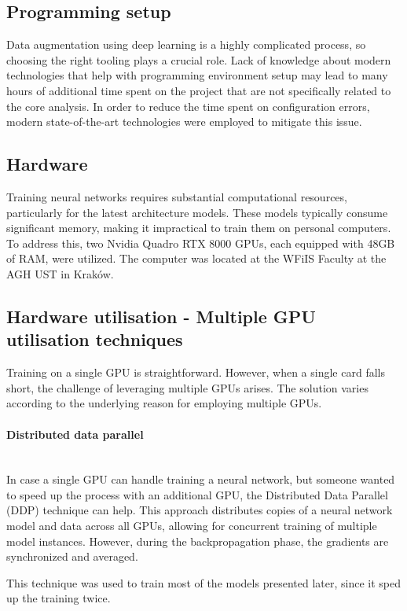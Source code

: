 \subsection{Programming setup}
Data augmentation using deep learning is a highly complicated process, so choosing the right tooling plays a crucial role. Lack of knowledge about modern technologies that help with programming environment setup may lead to many hours of additional time spent on the project that are not specifically related to the core analysis. In order to reduce the time spent on configuration errors, modern state-of-the-art technologies were employed to mitigate this issue.  


\newpage
\subsection{Hardware}
Training neural networks requires substantial computational resources, particularly for the latest architecture models. These models typically consume significant memory, making it impractical to train them on personal computers. To address this, two Nvidia Quadro RTX 8000 GPUs, each equipped with 48GB of RAM, were utilized. The computer was located at the WFiIS Faculty at the AGH UST in Kraków. 

\subsection{Hardware utilisation - Multiple GPU utilisation techniques}
Training on a single GPU is straightforward. However, when a single card falls short, the challenge of leveraging multiple GPUs arises. The solution varies according to the underlying reason for employing multiple GPUs.
\paragraph{Distributed data parallel}\mbox{} \\
\indent In case a single GPU can handle training a neural network, but someone wanted to speed up the process with an additional GPU, the Distributed Data Parallel (DDP) technique can help. This approach distributes copies of a neural network model and data across all GPUs, allowing for concurrent training of multiple model instances. However, during the backpropagation phase, the gradients are synchronized and averaged.

This technique was used to train most of the models presented later, since it sped up the training twice. 

